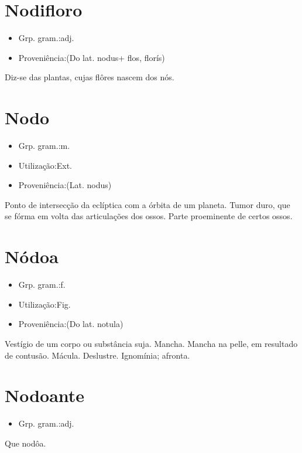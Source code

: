 \section{Nodifloro}
\begin{itemize}
\item {Grp. gram.:adj.}
\end{itemize}
\begin{itemize}
\item {Proveniência:(Do lat. \textunderscore nodus\textunderscore  + \textunderscore flos\textunderscore , \textunderscore florís\textunderscore )}
\end{itemize}
Diz-se das plantas, cujas flôres nascem dos nós.
\section{Nodo}
\begin{itemize}
\item {Grp. gram.:m.}
\end{itemize}
\begin{itemize}
\item {Utilização:Ext.}
\end{itemize}
\begin{itemize}
\item {Proveniência:(Lat. \textunderscore nodus\textunderscore )}
\end{itemize}
Ponto de intersecção da eclíptica com a órbita de um planeta.
Tumor duro, que se fórma em volta das articulações dos ossos.
Parte proeminente de certos ossos.
\section{Nódoa}
\begin{itemize}
\item {Grp. gram.:f.}
\end{itemize}
\begin{itemize}
\item {Utilização:Fig.}
\end{itemize}
\begin{itemize}
\item {Proveniência:(Do lat. \textunderscore notula\textunderscore )}
\end{itemize}
Vestígio de um corpo ou substância suja.
Mancha.
Mancha na pelle, em resultado de contusão.
Mácula.
Deslustre.
Ignomínia; afronta.
\section{Nodoante}
\begin{itemize}
\item {Grp. gram.:adj.}
\end{itemize}
Que nodôa.
